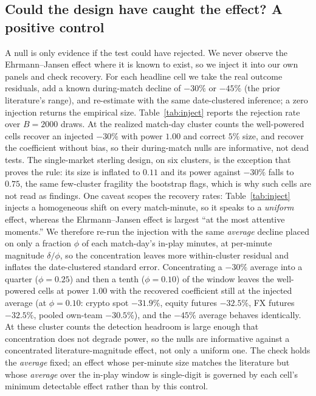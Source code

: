 \documentclass[12pt]{article}
\begin{document}
\subsection{Could the design have caught the effect? A positive control}\label{sec:inject}
A null is only evidence if the test could have rejected. We never observe the Ehrmann--Jansen effect where it
is known to exist, so we inject it into our own panels and check recovery. For each headline cell we take the
real outcome residuals, add a known during-match decline of $-30\%$ or $-45\%$ (the prior literature's range),
and re-estimate with the same date-clustered inference; a zero injection returns the empirical size. Table~\ref{tab:inject}
reports the rejection rate over $B=2000$ draws. At the realized match-day cluster counts the well-powered cells
recover an injected $-30\%$ with power $1.00$ and correct $5\%$ size, and recover the coefficient without bias,
so their during-match nulls are informative, not dead tests. The single-market sterling design, on six
clusters, is the exception that proves the rule: its size is inflated to $0.11$ and its power against $-30\%$
falls to $0.75$, the same few-cluster fragility the bootstrap flags, which is why such cells are not read as
findings. One caveat scopes the recovery rates: Table~\ref{tab:inject} injects a homogeneous shift on every
match-minute, so it speaks to a \emph{uniform} effect, whereas the Ehrmann--Jansen effect is largest ``at the
most attentive moments.'' We therefore re-run the injection with the same \emph{average} decline placed on
only a fraction $\phi$ of each match-day's in-play minutes, at per-minute magnitude $\delta/\phi$, so the
concentration leaves more within-cluster residual and inflates the date-clustered standard error.
Concentrating a $-30\%$ average into a quarter ($\phi=0.25$) and then a tenth ($\phi=0.10$) of the window
leaves the well-powered cells at power $1.00$ with the recovered coefficient still at the injected average
(at $\phi=0.10$: crypto spot $-31.9\%$, equity futures $-32.5\%$, FX futures $-32.5\%$, pooled own-team
$-30.5\%$), and the $-45\%$ average behaves identically. At these cluster counts the detection headroom is
large enough that concentration does not degrade power, so the nulls are informative against a concentrated
literature-magnitude effect, not only a uniform one. The check holds the \emph{average} fixed; an effect
whose per-minute size matches the literature but whose \emph{average} over the in-play window is single-digit
is governed by each cell's minimum detectable effect rather than by this control.
\end{document}

